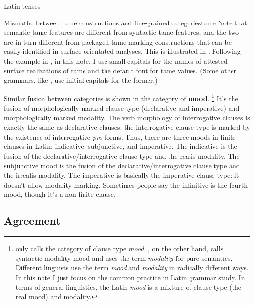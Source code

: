 \documentclass[a4paper, oneside, 12pt]{report}
\newcommand*{\concept}[1]{\textbf{#1}}
\newcommand*{\term}[1]{\emph{#1}}
\begin{document}
\begin{table}[H]
    \caption{Latin tenses}
    \label{tbl:latin-tense-aspect}
    \centering
        
\end{table}

\begin{infobox}{Mismathc between \ac{tame} constructions and fine-grained categories}{tame}
    Note that semantic \ac{tame} features are different from 
    syntactic \ac{tame} features,
    and the two are in turn different from packaged \ac{tame} marking constructions
    that can be easily identified in surface-orientated analyses.
    This is illustrated in .
    Following the example in \citet{grimm2021grammar},
    in this note, I use small capitals for the names of attested surface realizations of \ac{tame}
    and the default font for \ac{tame} values.
    (Some other grammars, like \citet{jacques2021grammar,friesen2017grammar}, 
    use initial capitals for the former.)
\end{infobox}

Similar fusion between categories is shown in the category of \concept{mood}.%
\footnote{
    \citet{dixon2009basic1} only calls the category of clause type \term{mood}.
    \citet{cgel}, on the other hand, 
    calls syntactic modality mood 
    and uses the term \term{modality} for pure semantics.
    Different linguists use the term \term{mood} and \term{modality} in radically different ways.
    In this note I just focus on the common practice in Latin grammar study.
    In terms of general linguistics, 
    the Latin \term{mood} is a mixture of clause type (the real mood)
    and modality.
}
It's the fusion of morphologically marked clause type 
(declarative and imperative)
and morphologically marked modality.
The verb morphology of interrogative clauses is exactly the same as declarative clauses:
the interrogative clause type is marked by the existence of interrogative \term{pro}-forms.
Thus, there are three moods in finite clauses in Latin:
\acl{indicative}, \acl{subjunctive}, and \acl{imperative}.
The \acl{indicative} is the fusion of 
the declarative/interrogative clause type and the realis modality.
The \acl{subjunctive} mood is the fusion of 
the declarative/interrogative clause type and the irrealis modality.
The \acl{imperative} is basically the imperative clause type:
it doesn't allow modality marking.
Sometimes people say the infinitive is the fourth mood,
though it's a non-finite clause.


\subsection{Agreement}\label{sec:agreement-abs}
\end{document}
